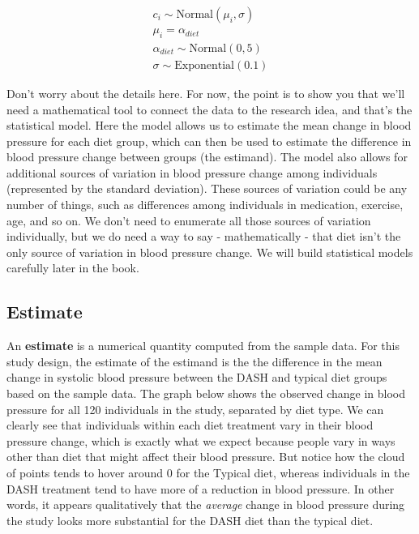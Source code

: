 \documentclass[
]{book}
\begin{document}
\[
\begin{array}{l}
c_i \sim \mathrm{Normal}(\mu_i, \sigma) \\
\mu_i = \alpha_{diet} \\ 
\alpha_{diet} \sim \mathrm{Normal}(0, 5) \\
\sigma \sim \mathrm{Exponential}(0.1)
\end{array}
\]

Don't worry about the details here. For now, the point is to show you that we'll need a mathematical tool to connect the data to the research idea, and that's the statistical model. Here the model allows us to estimate the mean change in blood pressure for each diet group, which can then be used to estimate the difference in blood pressure change between groups (the estimand). The model also allows for additional sources of variation in blood pressure change among individuals (represented by the standard deviation). These sources of variation could be any number of things, such as differences among individuals in medication, exercise, age, and so on. We don't need to enumerate all those sources of variation individually, but we do need a way to say - mathematically - that diet isn't the only source of variation in blood pressure change. We will build statistical models carefully later in the book.

\subsection{Estimate}\label{estimate}

An \textbf{estimate} is a numerical quantity computed from the sample data. For this study design, the estimate of the estimand is the the difference in the mean change in systolic blood pressure between the DASH and typical diet groups based on the sample data. The graph below shows the observed change in blood pressure for all 120 individuals in the study, separated by diet type. We can clearly see that individuals within each diet treatment vary in their blood pressure change, which is exactly what we expect because people vary in ways other than diet that might affect their blood pressure. But notice how the cloud of points tends to hover around 0 for the Typical diet, whereas individuals in the DASH treatment tend to have more of a reduction in blood pressure. In other words, it appears qualitatively that the \emph{average} change in blood pressure during the study looks more substantial for the DASH diet than the typical diet.
\end{document}

